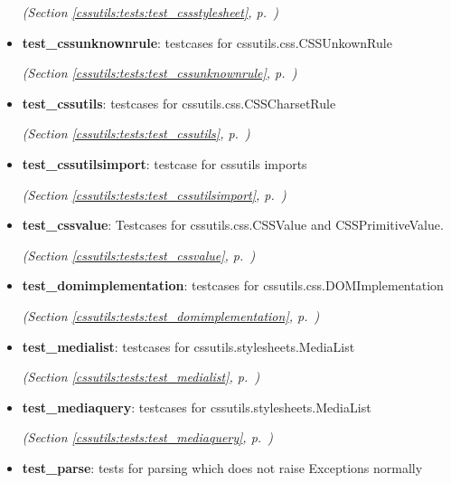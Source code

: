 \begin{itemize}
  \textit{(Section \ref{cssutils:tests:test_cssstylesheet}, p.~\pageref{cssutils:tests:test_cssstylesheet})}

\item \textbf{test\_cssunknownrule}: testcases for cssutils.css.CSSUnkownRule



  \textit{(Section \ref{cssutils:tests:test_cssunknownrule}, p.~\pageref{cssutils:tests:test_cssunknownrule})}

\item \textbf{test\_cssutils}: testcases for cssutils.css.CSSCharsetRule



  \textit{(Section \ref{cssutils:tests:test_cssutils}, p.~\pageref{cssutils:tests:test_cssutils})}

\item \textbf{test\_cssutilsimport}: testcase for cssutils imports



  \textit{(Section \ref{cssutils:tests:test_cssutilsimport}, p.~\pageref{cssutils:tests:test_cssutilsimport})}

\item \textbf{test\_cssvalue}: Testcases for cssutils.css.CSSValue and CSSPrimitiveValue.



  \textit{(Section \ref{cssutils:tests:test_cssvalue}, p.~\pageref{cssutils:tests:test_cssvalue})}

\item \textbf{test\_domimplementation}: testcases for cssutils.css.DOMImplementation



  \textit{(Section \ref{cssutils:tests:test_domimplementation}, p.~\pageref{cssutils:tests:test_domimplementation})}

\item \textbf{test\_medialist}: testcases for cssutils.stylesheets.MediaList



  \textit{(Section \ref{cssutils:tests:test_medialist}, p.~\pageref{cssutils:tests:test_medialist})}

\item \textbf{test\_mediaquery}: testcases for cssutils.stylesheets.MediaList



  \textit{(Section \ref{cssutils:tests:test_mediaquery}, p.~\pageref{cssutils:tests:test_mediaquery})}

\item \textbf{test\_parse}: tests for parsing which does not raise Exceptions normally




\end{itemize}
